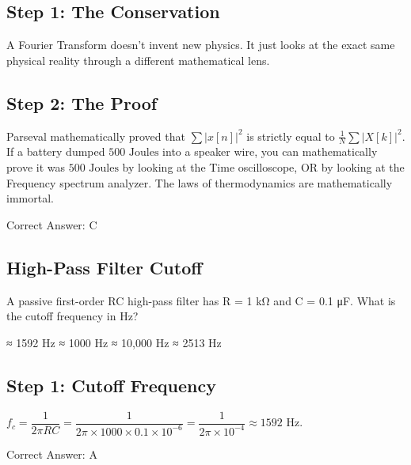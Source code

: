 \begin{solution}

\subsection*{Step 1: The Conservation}
A Fourier Transform doesn't invent new physics. It just looks at the exact same physical reality through a different mathematical lens.

\subsection*{Step 2: The Proof}
Parseval mathematically proved that $\sum |x[n]|^2$ is strictly equal to $\frac{1}{N} \sum |X[k]|^2$. If a battery dumped $500\text{ Joules}$ into a speaker wire, you can mathematically prove it was $500\text{ Joules}$ by looking at the Time oscilloscope, OR by looking at the Frequency spectrum analyzer. The laws of thermodynamics are mathematically immortal.

Correct Answer: C
\end{solution}

\clearpage

\subsection{High-Pass Filter Cutoff}

A passive first-order RC high-pass filter has R = 1 kΩ and C = 0.1 μF. What is the cutoff frequency in Hz?

\begin{choices}
    \correctchoice ≈ 1592 Hz
    \choice ≈ 1000 Hz
    \choice ≈ 10,000 Hz
    \choice ≈ 2513 Hz
\end{choices}

\begin{solution}

\subsection*{Step 1: Cutoff Frequency}
$f_c = \dfrac{1}{2\pi R C} = \dfrac{1}{2\pi \times 1000 \times 0.1 \times 10^{-6}} = \dfrac{1}{2\pi \times 10^{-4}} \approx 1592$ Hz.

Correct Answer: A
\end{solution}

\clearpage


